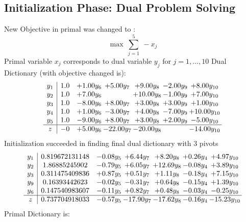 \documentclass[9pt]{article}
\begin{document}
\subsection{Initialization Phase: Dual Problem Solving}
New Objective in primal was changed to : \[ \max\ \sum_{j=1}^{5}\ - x_j \] 
Primal variable $x_j$ corresponds to dual variable $y_j$ for $j = 1,\ldots,10$
Dual Dictionary (with objective changed is): 
\[\begin{array}{c| c c@{\hskip 2pt} c@{\hskip 2pt} c@{\hskip 2pt} c@{\hskip 2pt} c@{\hskip 2pt} }
 y_{1}   &  1.0 & +  1.00 y_{6} & +  5.00 y_{7} & +  9.00 y_{8} & -2.00 y_{9} & +  8.00 y_{10}\\
 y_{2}   &  1.0 & +  7.00 y_{6} &   & + 10.00 y_{8} & -1.00 y_{9} & +  7.00 y_{10}\\
 y_{3}   &  1.0 & -8.00 y_{6} & +  8.00 y_{7} & +  3.00 y_{8} & +  3.00 y_{9} & +  1.00 y_{10}\\
 y_{4}   &  1.0 & +  1.00 y_{6} & -3.00 y_{7} & +  4.00 y_{8} & -7.00 y_{9} & + 10.00 y_{10}\\
 y_{5}   &  1.0 & -9.00 y_{6} & +  8.00 y_{7} & +  3.00 y_{8} & +  2.00 y_{9} & -5.00 y_{10}\\
\hline
z    &  -0 & +  5.00 y_{6} & -22.00 y_{7} & -20.00 y_{8} &   & -14.00 y_{10}\\
\end{array}\]
Initialization succeeded in finding final dual dictionary with 3 pivots
\[\begin{array}{c| c c@{\hskip 2pt} c@{\hskip 2pt} c@{\hskip 2pt} c@{\hskip 2pt} c@{\hskip 2pt} }
 y_{1}   &  0.819672131148 & -0.08 y_{5} & +  6.44 y_{7} & +  8.20 y_{8} & +  0.26 y_{4} & +  4.97 y_{10}\\
 y_{2}   &  1.86885245902 & -0.79 y_{5} & +  6.05 y_{7} & + 12.69 y_{8} & -0.08 y_{4} & +  3.89 y_{10}\\
 y_{3}   &  0.311475409836 & +  0.87 y_{5} & +  0.51 y_{7} & +  1.11 y_{8} & -0.18 y_{4} & +  7.15 y_{10}\\
 y_{9}   &  0.16393442623 & -0.02 y_{5} & -0.31 y_{7} & +  0.64 y_{8} & -0.15 y_{4} & +  1.39 y_{10}\\
 y_{6}   &  0.147540983607 & -0.11 y_{5} & +  0.82 y_{7} & +  0.48 y_{8} & -0.03 y_{4} & -0.25 y_{10}\\
\hline
z    &  0.737704918033 & -0.57 y_{5} & -17.90 y_{7} & -17.62 y_{8} & -0.16 y_{4} & -15.23 y_{10}\\
\end{array}\]
Primal Dictionary is:
\end{document}

